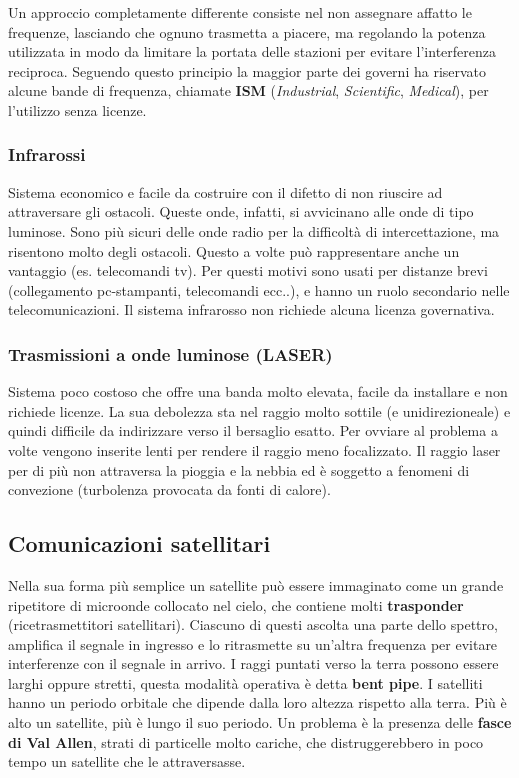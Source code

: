 Un approccio completamente differente consiste nel non assegnare affatto le frequenze, lasciando che ognuno trasmetta a piacere, ma regolando la potenza utilizzata in modo da limitare la portata delle stazioni per evitare l'interferenza reciproca. Seguendo questo principio la maggior parte dei governi ha riservato alcune bande di frequenza, chiamate \textbf{ISM} (\textit{Industrial}, \textit{Scientific}, \textit{Medical}), per l'utilizzo senza licenze.

\subsubsection{Infrarossi}

Sistema economico e facile da costruire con il difetto di non riuscire ad attraversare gli ostacoli. Queste onde, infatti, si avvicinano alle onde di tipo luminose. Sono più sicuri delle onde radio per la difficoltà di intercettazione, ma risentono molto degli ostacoli. Questo a volte può rappresentare anche un vantaggio (es. telecomandi tv). Per questi motivi sono usati per distanze brevi (collegamento pc-stampanti, telecomandi ecc..), e hanno un ruolo secondario nelle telecomunicazioni. Il sistema infrarosso non richiede alcuna licenza governativa.

\subsubsection{Trasmissioni a onde luminose (LASER)}

Sistema poco costoso che offre una banda molto elevata, facile da installare e non richiede licenze. La sua debolezza sta nel raggio molto sottile (e unidirezioneale) e quindi difficile da indirizzare verso il bersaglio esatto. Per ovviare al problema a volte vengono inserite lenti per rendere il raggio meno focalizzato. Il raggio laser per di più non attraversa la pioggia e la nebbia ed è soggetto a fenomeni di convezione (turbolenza provocata da fonti di calore).

\subsection{Comunicazioni satellitari}

Nella sua forma più semplice un satellite può essere immaginato come un grande ripetitore di microonde collocato nel cielo, che contiene molti \textbf{trasponder} (ricetrasmettitori satellitari). Ciascuno di questi ascolta una parte dello spettro, amplifica il segnale in ingresso e lo ritrasmette su un'altra frequenza per evitare interferenze con il segnale in arrivo. I raggi puntati verso la terra possono essere larghi oppure stretti, questa modalità operativa è detta \textbf{bent pipe}. I satelliti hanno un periodo orbitale che dipende dalla loro altezza rispetto alla terra. Più è alto un satellite, più è lungo il suo periodo. Un problema è la presenza delle \textbf{fasce di Val Allen}, strati di particelle molto cariche, che distruggerebbero in poco tempo un satellite che le attraversasse.

